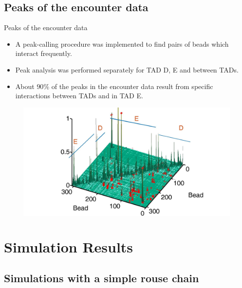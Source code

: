 \documentclass[8pt]{beamer}
\begin{document}
\subsection{Peaks of the encounter data}\label{subsection_peaksOfTheEncounterData}

\begin{frame}{Peaks of the encounter data}
\begin{itemize}
\item A peak-calling procedure was implemented to find pairs of beads which interact frequently. 
\item Peak analysis was performed separately for TAD D, E and between TADs. 
\item About $90\%$ of the peaks in the encounter data result from specific interactions between TADs and in TAD E.
\end{itemize}
\begin{figure}[H]
\includegraphics[scale=0.15]{peakListAverage}
\end{figure}

\end{frame}

\section{Simulation Results}\label{section_simulationResults}

\subsection{Simulations with a simple rouse chain}
\end{document}
